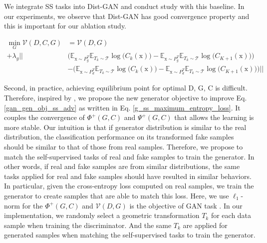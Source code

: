 \documentclass{article}
\begin{document}
We integrate SS tasks into Dist-GAN \cite{tran-eccv-2018} and conduct  study with this baseline. 
In our experiments, we observe that Dist-GAN has good convergence property and  this is important for our ablation study.





\begin{equation}
\begin{split}
\min_G\mathcal{V}(D,C,G) &= \mathcal{V}(D,G)\\
+ \lambda_g \bigg|\bigg|&\bigg(\mathbb{E}_{\mathrm{x} \sim {P_g^T}}\mathbb{E}_{T_k \sim \mathcal{T}}\log\Big(C_k(\mathrm{x})\Big) - \mathbb{E}_{\mathrm{x} \sim P_g^T}\mathbb{E}_{T_k \sim \mathcal{T}}\log\Big(C_{K+1}(\mathrm{x})\Big)\bigg) \\
&- \bigg(\mathbb{E}_{\mathrm{x} \sim {P_d^T}}\mathbb{E}_{T_k \sim \mathcal{T}}\log\Big(C_k(\mathrm{x})\Big) - \mathbb{E}_{\mathrm{x} \sim P_d^T}\mathbb{E}_{T_k \sim \mathcal{T}}\log\Big(C_{K+1}(\mathrm{x})\Big)\bigg)\bigg|\bigg|
\end{split}
\label{g_ss_maximum_entropy_loss}
\end{equation}

Second, in practice, achieving equilibrium point for optimal D, G, C is difficult. Therefore, inspired by \cite{tran-eccv-2018}, we propose the new generator objective to improve Eq. \ref{gan_gen_obj_ss_adv} as written in Eq. \ref{g_ss_maximum_entropy_loss}. It couples the convergence of $\Phi^+(G,C)$ and $\Psi^+(G,C)$ that allows the learning is more stable. Our intuition is that if generator distribution is similar to the real distribution, the classification performance on its transformed fake samples should be similar to that of those from real samples. Therefore, we propose to match the self-supervised tasks of real and fake samples to train the generator. In other words, if real and fake samples are from similar distributions, the same tasks applied for real and fake samples should have resulted in similar behaviors. In particular, given the cross-entropy loss computed on real samples, we train the generator to create samples that are able to match this loss. Here, we use $\ell_1$-norm for the $\Phi^+(G,C)$ and $\mathcal{V}(D,G)$ is the objective of GAN task \cite{tran-eccv-2018}. In our implementation, we randomly select a geometric transformation $T_k$ for each data sample when training the discriminator. And the same $T_k$ are applied for generated samples when matching the self-supervised tasks to train the generator. 
\end{document}
